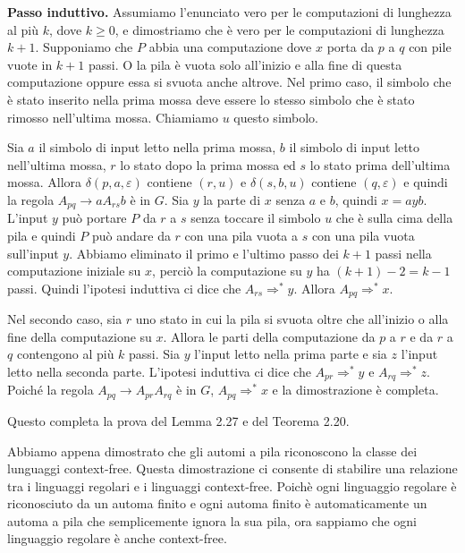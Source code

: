 \documentclass{article}
\begin{document}
\textbf{Passo induttivo.}
Assumiamo l'enunciato vero per le computazioni di lunghezza al più $k$, dove $k \geq 0$, e dimostriamo che è vero per le computazioni di lunghezza $k + 1$.
Supponiamo che $P$ abbia una computazione dove $x$ porta da $p$ a $q$ con pile vuote in $k + 1$ passi. 
O la pila è vuota solo all'inizio e alla fine di questa computazione oppure essa si svuota anche altrove.
Nel primo caso, il simbolo che è stato inserito nella prima mossa deve essere lo stesso simbolo che è stato rimosso nell'ultima mossa. 
Chiamiamo $u$ questo simbolo. 

Sia $a$ il simbolo di input letto nella prima mossa, $b$ il
simbolo di input letto nell'ultima mossa, $r$ lo stato dopo la prima mossa
ed $s$ lo stato prima dell'ultima mossa. Allora $\delta(p,a,\varepsilon)$ contiene $(r, u)$ e
$\delta(s,b,u)$ contiene $(q,\varepsilon)$ e quindi la regola $A_{pq} \rightarrow aA_{rs}b$ è in $G$.
Sia $y$ la parte di $x$ senza $a$ e $b$, quindi $x = ayb$. 
L'input $y$ può portare $P$ da $r$ a $s$ senza toccare il simbolo $u$ che è sulla cima della pila e quindi $P$ può
andare da $r$ con una pila vuota a $s$ con una pila vuota sull'input $y$. 
Abbiamo eliminato il primo e l'ultimo passo dei $k +1$ passi nella computazione iniziale
su $x$, perciò la computazione su $y$ ha $(k + 1) - 2 = k - 1$ passi.
Quindi l'ipotesi induttiva ci dice che $A_{rs} \Rightarrow^{*} y$. 
Allora $A_{pq} \Rightarrow^{*} x$.

Nel secondo caso, sia $r$ uno stato in cui la pila si svuota oltre che all'inizio o alla fine della computazione su $x$. 
Allora le parti della computazione da $p$ a $r$ e da $r$ a $q$ contengono al più $k$ passi. 
Sia $y$ l'input letto nella prima parte e sia $z$ l'input letto nella seconda parte. 
L'ipotesi induttiva ci dice che $A_{pr} \Rightarrow^{*} y$ e $A_{rq} \Rightarrow^{*} z$. 
Poiché la regola $A_{pq} \rightarrow A_{pr}A_{rq}$ è in $G$, $A_{pq} \Rightarrow^{*} x$ e
la dimostrazione è completa.

Questo completa la prova del Lemma 2.27 e del Teorema 2.20.
\vspace{1em}

Abbiamo appena dimostrato che gli automi a pila riconoscono la classe dei lunguaggi context-free.
Questa dimostrazione ci consente di stabilire una relazione tra i linguaggi regolari e i linguaggi context-free.
Poichè ogni linguaggio regolare è riconosciuto da un automa finito e ogni automa finito è automaticamente un automa a pila che semplicemente ignora la sua pila, ora sappiamo che ogni linguaggio regolare è anche context-free. 
\end{document}
